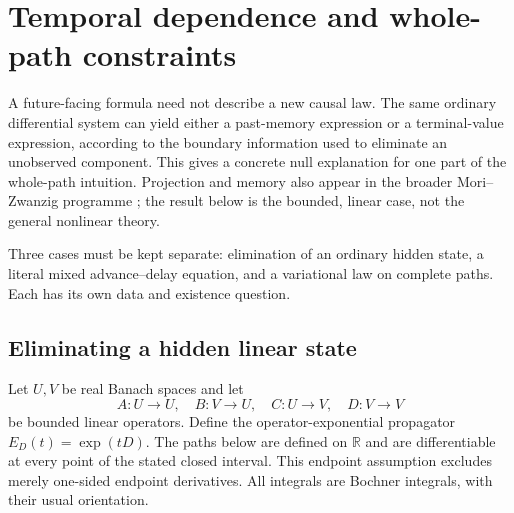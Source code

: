 \section{Temporal dependence and whole-path constraints}
\label{sec:temporal-elimination}

A future-facing formula need not describe a new causal law. The same
ordinary differential system can yield either a past-memory expression
or a terminal-value expression, according to the boundary information
used to eliminate an unobserved component. This gives a concrete null
explanation for one part of the whole-path intuition. Projection and
memory also appear in the broader Mori--Zwanzig programme
\cite{chorin2000optimal}; the result below is the bounded, linear case,
not the general nonlinear theory.

Three cases must be kept separate: elimination of an ordinary hidden
state, a literal mixed advance--delay equation, and a variational law
on complete paths. Each has its own data and existence question.

\subsection{Eliminating a hidden linear state}

Let $U,V$ be real Banach spaces and let
\[
 A:U\to U,\quad B:V\to U,\quad C:U\to V,\quad D:V\to V
\]
be bounded linear operators. Define the operator-exponential propagator
$E_D(t)=\exp(tD)$. The paths below are defined on $\mathbb R$ and are
differentiable at every point of the stated closed interval. This
endpoint assumption excludes merely one-sided endpoint derivatives.
All integrals are Bochner
integrals, with their usual orientation.

